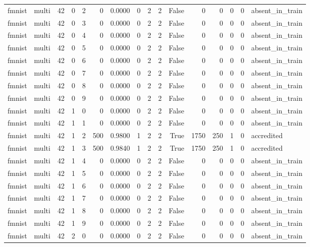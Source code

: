 \begin{tabular}{llrrrrrrrrrrrrrl}
fmnist & multi & 42 & 0 & 2 & 0 & 0.0000 & 0 & 2 & 2 & False & 0 & 0 & 0 & 0 & absent\_in\_train \\
fmnist & multi & 42 & 0 & 3 & 0 & 0.0000 & 0 & 2 & 2 & False & 0 & 0 & 0 & 0 & absent\_in\_train \\
fmnist & multi & 42 & 0 & 4 & 0 & 0.0000 & 0 & 2 & 2 & False & 0 & 0 & 0 & 0 & absent\_in\_train \\
fmnist & multi & 42 & 0 & 5 & 0 & 0.0000 & 0 & 2 & 2 & False & 0 & 0 & 0 & 0 & absent\_in\_train \\
fmnist & multi & 42 & 0 & 6 & 0 & 0.0000 & 0 & 2 & 2 & False & 0 & 0 & 0 & 0 & absent\_in\_train \\
fmnist & multi & 42 & 0 & 7 & 0 & 0.0000 & 0 & 2 & 2 & False & 0 & 0 & 0 & 0 & absent\_in\_train \\
fmnist & multi & 42 & 0 & 8 & 0 & 0.0000 & 0 & 2 & 2 & False & 0 & 0 & 0 & 0 & absent\_in\_train \\
fmnist & multi & 42 & 0 & 9 & 0 & 0.0000 & 0 & 2 & 2 & False & 0 & 0 & 0 & 0 & absent\_in\_train \\
fmnist & multi & 42 & 1 & 0 & 0 & 0.0000 & 0 & 2 & 2 & False & 0 & 0 & 0 & 0 & absent\_in\_train \\
fmnist & multi & 42 & 1 & 1 & 0 & 0.0000 & 0 & 2 & 2 & False & 0 & 0 & 0 & 0 & absent\_in\_train \\
fmnist & multi & 42 & 1 & 2 & 500 & 0.9800 & 1 & 2 & 2 & True & 1750 & 250 & 1 & 0 & accredited \\
fmnist & multi & 42 & 1 & 3 & 500 & 0.9840 & 1 & 2 & 2 & True & 1750 & 250 & 1 & 0 & accredited \\
fmnist & multi & 42 & 1 & 4 & 0 & 0.0000 & 0 & 2 & 2 & False & 0 & 0 & 0 & 0 & absent\_in\_train \\
fmnist & multi & 42 & 1 & 5 & 0 & 0.0000 & 0 & 2 & 2 & False & 0 & 0 & 0 & 0 & absent\_in\_train \\
fmnist & multi & 42 & 1 & 6 & 0 & 0.0000 & 0 & 2 & 2 & False & 0 & 0 & 0 & 0 & absent\_in\_train \\
fmnist & multi & 42 & 1 & 7 & 0 & 0.0000 & 0 & 2 & 2 & False & 0 & 0 & 0 & 0 & absent\_in\_train \\
fmnist & multi & 42 & 1 & 8 & 0 & 0.0000 & 0 & 2 & 2 & False & 0 & 0 & 0 & 0 & absent\_in\_train \\
fmnist & multi & 42 & 1 & 9 & 0 & 0.0000 & 0 & 2 & 2 & False & 0 & 0 & 0 & 0 & absent\_in\_train \\
fmnist & multi & 42 & 2 & 0 & 0 & 0.0000 & 0 & 2 & 2 & False & 0 & 0 & 0 & 0 & absent\_in\_train \\

\end{tabular}
